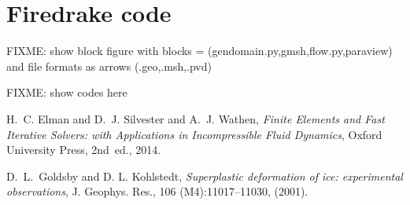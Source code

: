\documentclass[letterpaper,final,12pt,reqno]{amsart}
\begin{document}
\section{Firedrake code}

FIXME: show block figure with blocks = (gendomain.py,gmsh,flow.py,paraview) and file formats as arrows (.geo,.msh,.pvd)

FIXME: show codes here



\footnotesize

\bigskip

\begin{thebibliography}{4}






{\sc H.~C. Elman and D.~J. Silvester and A.~J. Wathen}, {\em Finite Elements
  and Fast Iterative Solvers: with Applications in Incompressible Fluid Dynamics},
  Oxford University Press, 2nd~ed., 2014.

{\sc D.~L.~Goldsby and D. L. Kohlstedt}, {\em Superplastic deformation of ice:
  experimental observations}, J. Geophys. Res., 106 (M4):11017--11030, (2001).


\end{thebibliography}
\end{document}
